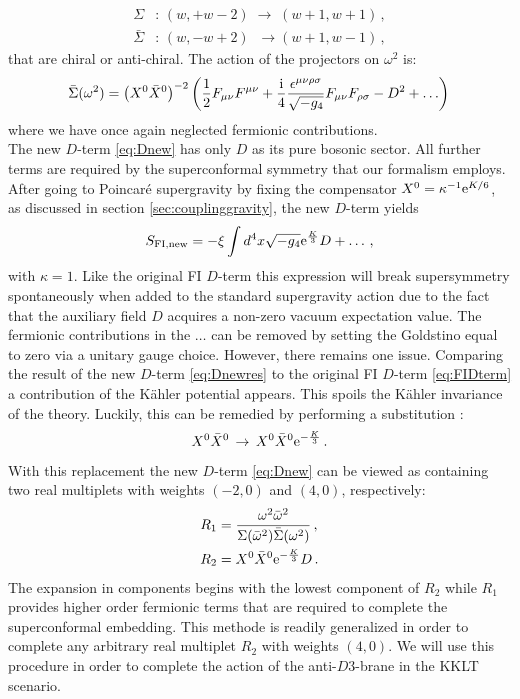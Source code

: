 \documentclass[a4paper,12pt]{report}
\newcommand{\be}{\begin{equation}}
\newcommand{\ee}{\end{equation}}
\newcommand{\bea}{\begin{equation}\begin{aligned}}
\newcommand{\eea}{\end{aligned}\end{equation}}
\def\rmi{{\rm i}}
\def\rme{{\rm e}}
\begin{document}
\bea 
\Sigma&:\,(w,+w-2)\; \to \;(w+1,w+1)\,,\\
\bar{\Sigma}&:\,(w,-w+2)\; \;\to (w+1,w-1)\,,
\eea
that are chiral or anti-chiral. The action of the projectors on $\omega^2$ is:
\be 
\bar{\Sigma}(\omega^2)=\left(X^0\bar{X}^0\right)^{-2} \left(\frac{1}{2}F_{\mu\nu}F^{\mu\nu}+\frac{\rmi}{4}\frac{\epsilon^{\mu\nu\rho\sigma}}{\sqrt{-g_4}}F_{\mu\nu}F_{\rho\sigma}-D^2 + \ldots\right)\,
\ee
where we have once again neglected fermionic contributions.\\
The new $D$-term \eqref{eq:Dnew} has only $D$ as its pure bosonic sector. All further terms are required by the superconformal symmetry that our formalism employs. After going to Poincar\'{e} supergravity by fixing the compensator $X^0 = \kappa^{-1} \rme^{K/6}$, as discussed in section \ref{sec:couplinggravity}, the new $D$-term yields
\be 
S_{\text{FI,new}} = -\xi \int d^4x \sqrt{-g_4} \rme^{\frac{K}{3}}D + \ldots\,,
\label{eq:Dnewres}
\ee
with $\kappa = 1$. Like the original FI $D$-term this expression will break supersymmetry spontaneously when added to the standard supergravity action due to the fact that the auxiliary field $D$ acquires a non-zero vacuum expectation value. The fermionic contributions in the $\ldots$ can be removed by setting the Goldstino equal to zero via a unitary gauge choice. However, there remains one issue. Comparing the result of the new $D$-term \eqref{eq:Dnewres} to the original FI $D$-term \eqref{eq:FIDterm} a contribution of the Kähler potential appears. This spoils the Kähler invariance of the theory. Luckily, this can be remedied by performing a substitution \cite{Antoniadis:2018oeh}:
\be 
X^0 \bar{X}^0 \,\to\,X^0\bar{X}^0 \rme^{-\frac{K}{3}}\,.
\ee
With this replacement the new $D$-term \eqref{eq:Dnew} can be viewed as containing two real multiplets with weights $(-2,0)$ and $(4,0)$, respectively:
\bea 
R_1 &=\frac{\omega^2\bar{\omega}^2}{\Sigma(\bar{\omega}^2)\bar{\Sigma}(\omega^2)}\,,\\
R_2 &= X^0\bar{X}^0 \rme^{-\frac{K}{3}}D\,.
\eea
The expansion in components begins with the lowest component of $R_2$ while $R_1$ provides higher order fermionic terms that are required to complete the superconformal embedding. This methode is readily generalized in order to complete any arbitrary real multiplet $R_2$ with weights $(4,0)$. We will use this procedure in order to complete the action of the anti-$D3$-brane in the KKLT scenario.
\end{document}

